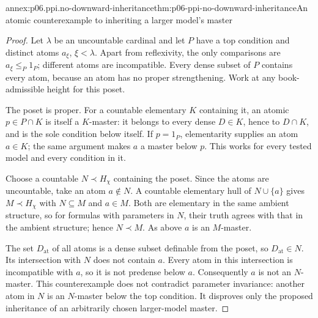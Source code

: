 \begin{annexitem}{annex:p06.ppi.no-downward-inheritance}{thm:p06-ppi-no-downward-inheritance}{An atomic counterexample to inheriting a larger model's master}
\begin{proof}
Let \(\lambda\) be an uncountable cardinal and let \(P\) have a top
condition and distinct atoms \(a_\xi\), \(\xi<\lambda\). Apart from
reflexivity, the only comparisons are \(a_\xi\leq_P1_P\); different
atoms are incompatible. Every dense subset of \(P\) contains every
atom, because an atom has no proper strengthening. Work at any
book-admissible height for this poset.

The poset is proper. For a countable elementary \(K\) containing it,
an atomic \(p\in P\cap K\) is itself a \(K\)-master: it belongs to
every dense \(D\in K\), hence to \(D\cap K\), and is the sole
condition below itself. If \(p=1_P\), elementarity supplies an atom
\(a\in K\); the same argument makes \(a\) a master below \(p\).
This works for every tested model and every condition in it.

Choose a countable \(N\prec H_\chi\) containing the poset. Since
the atoms are uncountable, take an atom \(a\notin N\). A countable
elementary hull of \(N\cup\{a\}\) gives \(M\prec H_\chi\) with
\(N\subseteq M\) and \(a\in M\). Both are elementary in the same
ambient structure, so for formulas with parameters in \(N\), their
truth agrees with that in the ambient structure; hence \(N\prec M\).
As above \(a\) is an \(M\)-master.

The set \(D_{\mathrm{at}}\) of all atoms is a dense subset definable
from the poset, so \(D_{\mathrm{at}}\in N\). Its intersection with
\(N\) does not contain \(a\). Every atom in this intersection is
incompatible with \(a\), so it is not predense below \(a\).
Consequently \(a\) is not an \(N\)-master. This counterexample does
not contradict parameter invariance: another atom in \(N\) is an
\(N\)-master below the top condition. It disproves only the proposed
inheritance of an arbitrarily chosen larger-model master.
\end{proof}
\end{annexitem}

